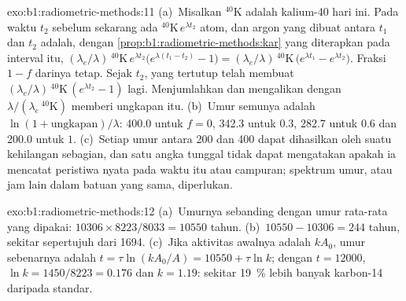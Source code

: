 \begin{solution}{exo:b1:radiometric-methods:11}
(a)~Misalkan ${}^{40}\mathrm{K}$ adalah kalium-40 hari ini. Pada waktu $t_2$ sebelum
sekarang ada ${}^{40}\mathrm{K}\,e^{\lambda t_2}$ atom, dan argon yang dibuat antara
$t_1$ dan $t_2$ adalah, dengan \cref{prop:b1:radiometric-methods:kar} yang diterapkan pada
interval itu, $(\lambda_e/\lambda)\,{}^{40}\mathrm{K}\,e^{\lambda
t_2}\bigl(e^{\lambda (t_1 - t_2)} - 1\bigr) = (\lambda_e/\lambda)\,
{}^{40}\mathrm{K}\,\bigl(e^{\lambda t_1} - e^{\lambda t_2}\bigr)$. Fraksi
$1 - f$ darinya tetap. Sejak $t_2$,  yang tertutup telah membuat
$(\lambda_e/\lambda)\,{}^{40}\mathrm{K}\,(e^{\lambda t_2} - 1)$ lagi. Menjumlahkan dan
mengalikan dengan $\lambda/(\lambda_e\,{}^{40}\mathrm{K})$ memberi ungkapan itu.
(b)~Umur semunya adalah $\ln(1 + \text{ungkapan})/\lambda$: \qty{400.0}{\Ma} untuk
$f = 0$, \qty{342.3}{\Ma} untuk $0.3$, \qty{282.7}{\Ma} untuk $0.6$ dan
\qty{200.0}{\Ma} untuk $1$. (c)~Setiap umur antara \qty{200}{\Ma} dan
\qty{400}{\Ma} dapat dihasilkan oleh suatu kehilangan sebagian, dan satu angka tunggal
tidak dapat mengatakan apakah ia mencatat peristiwa nyata pada waktu itu atau campuran;
spektrum umur, atau jam lain dalam batuan yang sama, diperlukan.
\end{solution}

\begin{solution}{exo:b1:radiometric-methods:12}
(a)~Umurnya sebanding dengan umur rata-rata yang dipakai: $10306 \times 8223/8033 =
\num{10550}$ tahun. (b)~$10550 - 10306 = 244$ tahun, sekitar sepertujuh dari
\num{1694}. (c)~Jika aktivitas awalnya adalah $k A_0$, umur sebenarnya adalah $t = \tau
\ln(k A_0/A) = \num{10550} + \tau \ln k$; dengan $t = \num{12000}$, $\ln k =
1450/8223 = 0.176$ dan $k = 1.19$: sekitar \qty{19}{\percent} lebih banyak karbon-14
daripada standar.
\end{solution}

